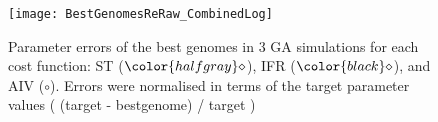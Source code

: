 




\clearpage

\begin{figure}[tb!]
  \centering
  \texttt{[image: BestGenomesReRaw\_CombinedLog]}
  \caption{Parameter errors of the best genomes in 3 GA
    simulations for each cost function: ST (${\color{halfgray} \diamond }$), IFR (${\color{black} \diamond }$), and AIV (${\circ}$). Errors were normalised in terms
    of the target parameter values ( (target - bestgenome) / target )}\label{fig:R2b}
\end{figure}




